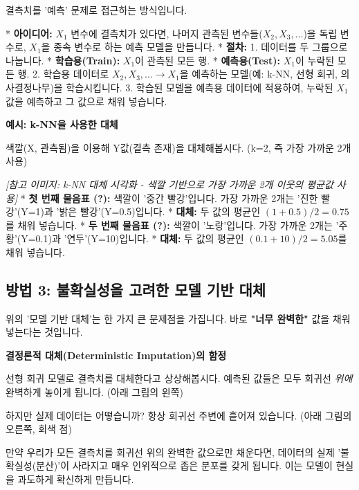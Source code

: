 \documentclass[11pt,a4paper]{book}
\theoremstyle{definition}
\begin{document}
결측치를 '예측' 문제로 접근하는 방식입니다.

* \textbf{아이디어:} \(X_1\) 변수에 결측치가 있다면, 나머지 관측된 변수들(\(X_2, X_3, ...\))을 독립 변수로, \(X_1\)을 종속 변수로 하는 예측 모델을 만듭니다.
* \textbf{절차:}
    1.  데이터를 두 그룹으로 나눕니다.
        * \textbf{학습용(Train):} \(X_1\)이 관측된 모든 행.
        * \textbf{예측용(Test):} \(X_1\)이 누락된 모든 행.
    2.  학습용 데이터로 \(X_2, X_3, ... \to X_1\)을 예측하는 모델(예: k-NN, 선형 회귀, 의사결정나무)을 학습시킵니다.
    3.  학습된 모델을 예측용 데이터에 적용하여, 누락된 \(X_1\) 값을 예측하고 그 값으로 채워 넣습니다.

\begin{examplebox}[title={예제}]
    \textbf{예시: k-NN을 사용한 대체}

    색깔(X, 관측됨)을 이용해 Y값(결측 존재)을 대체해봅시다. (k=2, 즉 가장 가까운 2개 사용)

    \textit{[참고 이미지: k-NN 대체 시각화 - 색깔 기반으로 가장 가까운 2개 이웃의 평균값 사용]}
    * \textbf{첫 번째 물음표 (?):} 색깔이 '중간 빨강'입니다. 가장 가까운 2개는 '진한 빨강'(Y=1)과 '밝은 빨강'(Y=0.5)입니다.
    * \textbf{대체:} 두 값의 평균인 \((1 + 0.5) / 2 = 0.75\)를 채워 넣습니다.
    * \textbf{두 번째 물음표 (?):} 색깔이 '노랑'입니다. 가장 가까운 2개는 '주황'(Y=0.1)과 '연두'(Y=10)입니다.
    * \textbf{대체:} 두 값의 평균인 \((0.1 + 10) / 2 = 5.05\)를 채워 넣습니다.
\end{examplebox}

\subsection{방법 3: 불확실성을 고려한 모델 기반 대체}

위의 '모델 기반 대체'는 한 가지 큰 문제점을 가집니다. 바로 \textbf{"너무 완벽한"} 값을 채워 넣는다는 것입니다.

\begin{warningbox}
    \textbf{결정론적 대체(Deterministic Imputation)의 함정}

    선형 회귀 모델로 결측치를 대체한다고 상상해봅시다. 예측된 값들은 모두 회귀선 \textit{위에} 완벽하게 놓이게 됩니다. (아래 그림의 왼쪽)

    하지만 실제 데이터는 어떻습니까? 항상 회귀선 주변에 흩어져 있습니다. (아래 그림의 오른쪽, 회색 점)

    만약 우리가 모든 결측치를 회귀선 위의 완벽한 값으로만 채운다면, 데이터의 실제 '불확실성(분산)'이 사라지고 매우 인위적으로 좁은 분포를 갖게 됩니다. 이는 모델이 현실을 과도하게 확신하게 만듭니다.
\end{warningbox}
\end{document}
